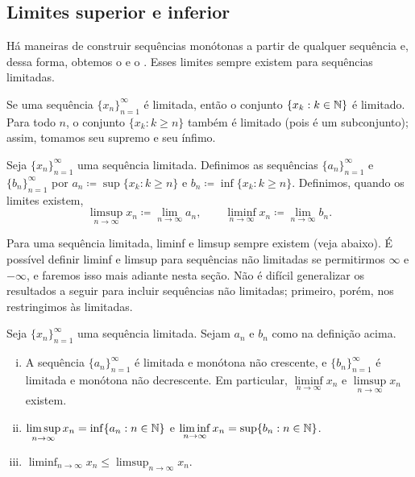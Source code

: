 \subsection{Limites superior e inferior}

Há maneiras de construir sequências monótonas a partir de qualquer sequência e,
dessa forma, obtemos o
\emph{} e o
\emph{}. Esses limites sempre existem para sequências
limitadas.

Se uma sequência $\{ x_n \}_{n=1}^\infty$ é limitada, então
o conjunto $\{ x_k : k \in {\mathbb{N}} \}$ é limitado. Para todo $n$,
o conjunto $\{ x_k : k \geq n \}$ também é limitado (pois é um subconjunto); assim,
tomamos seu supremo e seu ínfimo.

\begin{defn} \label{liminflimsup:def}
Seja $\{ x_n \}_{n=1}^\infty$ uma sequência limitada. Definimos as sequências
$\{ a_n \}_{n=1}^\infty$
e $\{ b_n \}_{n=1}^\infty$ por
$a_n \coloneqq \sup \{ x_k : k \geq n \}$ e
$b_n \coloneqq \inf \{ x_k : k \geq n \}$.
Definimos, quando os limites existem,
\begin{equation*}
\limsup_{n \to \infty} x_n \coloneqq \lim_{n \to \infty} a_n ,
\qquad
\liminf_{n \to \infty} x_n \coloneqq \lim_{n \to \infty} b_n .
\end{equation*}
\end{defn}

Para uma sequência limitada, liminf e limsup sempre existem (veja abaixo). É possível
definir liminf e limsup para sequências não limitadas se permitirmos $\infty$
e $-\infty$, e faremos isso mais adiante nesta seção.
Não é difícil generalizar os resultados a seguir para
incluir sequências não limitadas; primeiro, porém, nos restringimos às
limitadas.

\begin{prop}
Seja $\{ x_n \}_{n=1}^\infty$ uma sequência limitada. Sejam $a_n$ e $b_n$ como na
definição acima.
\begin{enumerate}[(i)]
\item
A sequência $\{ a_n \}_{n=1}^\infty$ é limitada e monótona não crescente,
e $\{ b_n \}_{n=1}^\infty$ é limitada e monótona não decrescente. Em particular,
$\liminf\limits_{n\to\infty} x_n$ e $\limsup\limits_{n\to\infty} x_n$ existem.
\item
$\displaystyle \limsup_{n \to \infty} x_n = \inf \{ a_n : n \in {\mathbb{N}} \}$
e
$\displaystyle \liminf_{n \to \infty} x_n = \sup \{ b_n : n \in {\mathbb{N}} \}$.
\item
$\displaystyle \liminf_{n \to \infty} x_n \leq \limsup_{n \to \infty} x_n$.
\end{enumerate}
\end{prop}

